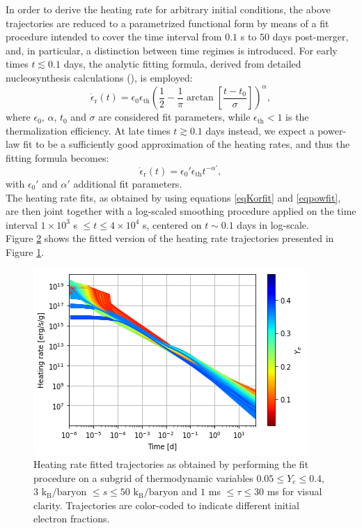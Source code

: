 \documentclass[fleqn,usenatbib]{mnras}
\begin{document}
\begin{itemize}
\begin{figure}
    \label{heatrates}
    \end{figure}
    In order to derive the heating rate for arbitrary initial conditions, the above trajectories are reduced to a parametrized functional form by means of a fit procedure intended to cover the time interval from $0.1$ s to $50$ days post-merger, and, in particular, a distinction between time regimes is introduced. For early times $t\lesssim0.1$ days, the analytic fitting formula, derived from detailed nucleosynthesis calculations (\cite{Korobkin:2012uy}), is employed:
    \begin{equation}
    \label{eqKorfit}
    \dot{\epsilon}_{\mathrm{r}}(t)=\epsilon_0\epsilon_{\mathrm{th}}\left(\frac{1}{2}-\frac{1}{\pi}\arctan{\left[\frac{t-t_0}{\sigma}\right]}\right)^{\alpha},
    \end{equation}
    where $\epsilon_0$, $\alpha$, $t_0$ and $\sigma$ are considered fit parameters, while $\epsilon_{\mathrm{th}}<1$ is the thermalization efficiency. At late times $t\gtrsim0.1$ days instead, we expect a power-law fit to be a sufficiently good approximation of the heating rates, and thus the fitting formula becomes:
    \begin{equation}
    \label{eqpowfit}
    \dot{\epsilon}_{\mathrm{r}}(t)=\epsilon_0'\epsilon_{\mathrm{th}}t^{-\alpha'},
    \end{equation}
    with $\epsilon_0'$ and $\alpha'$ additional fit parameters.\\
    The heating rate fits, as obtained by using equations \ref{eqKorfit} and \ref{eqpowfit}, are then joint together with a log-scaled smoothing procedure applied on the time interval $1\times10^3$ s $\leq t\leq4\times10^4$ s, centered on $t\sim0.1$ days in log-scale.\\
    Figure \ref{heatratesfit} shows the fitted version of the heating rate trajectories presented in Figure \ref{heatrates}.
    \begin{figure}
    \centering
    \includegraphics[scale=0.65]{heatratesfit.png}
    \caption{Heating rate fitted trajectories as obtained by performing the fit procedure on a subgrid of thermodynamic variables $0.05\leq Y_e\leq0.4$, $3$ $\mathrm{k_B/baryon}$ $\leq s\leq50$ $\mathrm{k_B/baryon}$ and $1$ ms $\leq\tau\leq30$ ms for visual clarity. Trajectories are color-coded to indicate different initial electron fractions.}
    \label{heatratesfit}
    \end{figure}
    

\end{itemize}
\end{document}
